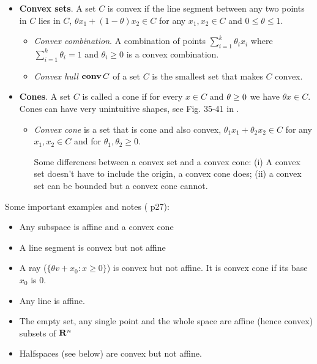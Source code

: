 \documentclass[a4paper, oneside]{book}
\begin{document}
\begin{itemize}
\begin{itemize}
	\end{itemize} 
\item \textbf{Convex sets}. A set $C$ is convex if the line segment between any two points in $C$ lies in $C$, \ie  $\theta x_1 +(1-\theta) x_2 \in C$ for any $x_1,x_2 \in C$ and $0 \le \theta \le 1$.
	\begin{itemize}
	\item \textit{Convex combination}. A combination of points $\sum_{i=1}^k \theta_i x_i$ where $\sum_{i=1}^k\theta_i = 1$ and $\theta_i\ge 0$ is a convex combination.
	\item \textit{Convex hull} $\textbf{conv}\,C$ of a set $C$ is the smallest set that makes $C$ convex.
	\end{itemize}
\item \textbf{Cones}. A set $C$ is called a cone if for every $x \in C$ and $\mathbf \theta \ge 0$ we have $\theta x \in C$. Cones can have very unintuitive shapes, see Fig. 35-41 in \cite{dattorro10}.
	\begin{itemize}
	\item \textit{Convex cone} is a set that is cone and also convex, \ie $\theta_1 x_1 + \theta_2 x_2 \in C$ for any $x_1, x_2 \in C$ and for $\theta_1, \theta_2 \ge 0$.
	
	Some differences between a convex set and a convex cone: (i) A convex set doesn't have to include the origin, a convex cone does; (ii) a convex set can be bounded but a convex cone cannot. 
	
	\end{itemize}
\end{itemize}

Some important examples and notes (\cite{boyd04} p27):
\begin{itemize}
\item Any subspace is affine and a convex cone
\item A line segment is convex but not affine
\item A ray (\ie $\{\theta v + x_0 : x\ge 0\}$) is convex but not affine. It is convex cone if its base $x_0$ is 0.
\item Any line is affine. 
\item The empty set, any single point and the whole space are affine (hence convex) subsets of $\mathbf R^n$
\item Halfspaces (see below) are convex but not affine.
\end{itemize}
\end{document}
